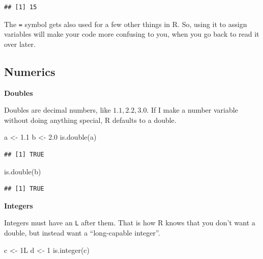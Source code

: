\documentclass[
]{book}
\newenvironment{Shaded}{\begin{snugshade}}{\end{snugshade}}
\newcommand{\DecValTok}[1]{\textcolor[rgb]{0.00,0.00,0.81}{#1}}
\newcommand{\FloatTok}[1]{\textcolor[rgb]{0.00,0.00,0.81}{#1}}
\newcommand{\FunctionTok}[1]{\textcolor[rgb]{0.00,0.00,0.00}{#1}}
\newcommand{\NormalTok}[1]{#1}
\newcommand{\OtherTok}[1]{\textcolor[rgb]{0.56,0.35,0.01}{#1}}
\begin{document}
\begin{verbatim}
## [1] 15
\end{verbatim}

The \texttt{=} symbol gets also used for a few other things in R. So, using it to assign variables will make your code more confusing to you, when you go back to read it over later.

\hypertarget{numerics}{%
\subsection{Numerics}\label{numerics}}

\textbf{Doubles}

Doubles are decimal numbers, like \(1.1, 2.2, 3.0\). If I make a number variable without doing anything special, R defaults to a double.

\begin{Shaded}
\begin{Highlighting}[]
\NormalTok{a }\OtherTok{\textless{}{-}} \FloatTok{1.1}
\NormalTok{b }\OtherTok{\textless{}{-}} \FloatTok{2.0}
\FunctionTok{is.double}\NormalTok{(a)}
\end{Highlighting}
\end{Shaded}

\begin{verbatim}
## [1] TRUE
\end{verbatim}

\begin{Shaded}
\begin{Highlighting}[]
\FunctionTok{is.double}\NormalTok{(b)}
\end{Highlighting}
\end{Shaded}

\begin{verbatim}
## [1] TRUE
\end{verbatim}

\textbf{Integers}

Integers must have an \texttt{L} after them. That is how R knows that you don't want a double, but instead want a ``long-capable integer''.

\begin{Shaded}
\begin{Highlighting}[]
\NormalTok{c }\OtherTok{\textless{}{-}}\NormalTok{ 1L}
\NormalTok{d }\OtherTok{\textless{}{-}} \DecValTok{1}
\FunctionTok{is.integer}\NormalTok{(c)}
\end{Highlighting}
\end{Shaded}
\end{document}

